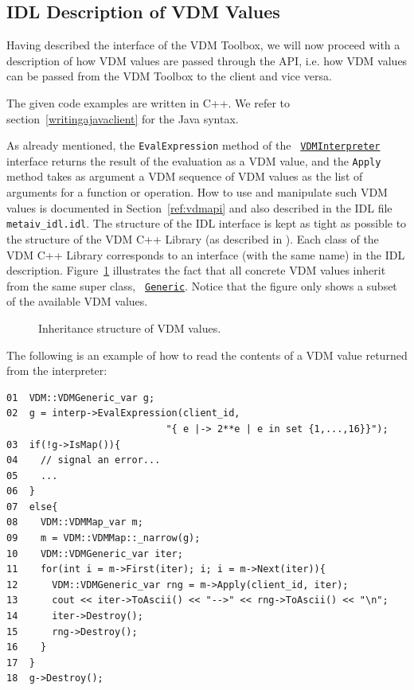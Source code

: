 \documentclass[\pformat,12pt]{article}
\newcommand{\Generic}{\hyperlink{interface.Generic}{Generic}}
\newcommand{\VDMInterpreter}{\hyperlink{interface.VDMInterpreter}{VDMInterpreter}}
\begin{document}
\subsection{IDL Description of VDM Values}
\label{idldescriptionvalues}

Having described the interface of the VDM Toolbox, we will now proceed
with a description of how VDM values are passed through the API,
i.e. how VDM values can be passed from the VDM Toolbox to the client
and vice versa. 

The given code examples are written in C++. We refer to
section~\ref{writingajavaclient} for the Java syntax.

As already mentioned, the {\tt EvalExpression} method of the {\tt
  \VDMInterpreter} interface returns the result of the evaluation as a
VDM value, and the {\tt Apply} method takes as argument a VDM sequence
of VDM values as the list of arguments for a function or operation.
How to use and manipulate such VDM values is documented in Section~\ref{ref:vdmapi}
and also described in the IDL file {\tt metaiv\_idl.idl}. The structure of
the IDL interface is kept as tight as possible to the structure of the
VDM C++ Library (as described in \cite{LibMan-SCSK}).  Each class of the
VDM C++ Library corresponds to an interface (with the same name) in
the IDL description. Figure~\ref{fig:VDMvalues} illustrates the fact
that all concrete VDM values inherit from the same super class, {\tt
  \Generic}.  Notice that the figure only shows a subset of the
available VDM values.

\begin{figure}[tbh]
\begin{center}
\mbox{}
\caption{Inheritance structure of VDM values.}\label{fig:VDMvalues}
\end{center}
\end{figure}

The following is an example of how to read the contents of a VDM value
returned from the interpreter: 

\begin{verbatim}
01  VDM::VDMGeneric_var g;
02  g = interp->EvalExpression(client_id, 
                            "{ e |-> 2**e | e in set {1,...,16}}");
03  if(!g->IsMap()){
04    // signal an error...
05    ...
06  }
07  else{
08    VDM::VDMMap_var m;
09    m = VDM::VDMMap::_narrow(g);
10    VDM::VDMGeneric_var iter;
11    for(int i = m->First(iter); i; i = m->Next(iter)){
12      VDM::VDMGeneric_var rng = m->Apply(client_id, iter);
13      cout << iter->ToAscii() << "-->" << rng->ToAscii() << "\n"; 
14      iter->Destroy();
15      rng->Destroy();
16    }
17  }
18  g->Destroy();
\end{verbatim}
\end{document}

